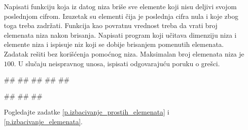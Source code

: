 \begin{Exercise}[label=v.brisanje_elemenata]
Napisati funkciju koja iz datog niza briše sve elemente koji nisu
deljivi svojom poslednjom cifrom. Izuzetak su elementi čija je poslednja
cifra nula i koje zbog toga treba zadržati. Funkcija kao povratnu vrednost treba
da vrati broj elemenata niza nakon brisanja. 
Napisati program koji učitava dimenziju niza i elemente niza i ispisuje niz koji se dobije 
brisanjem pomenutih elemenata. Zadatak rešiti bez korišćenja pomoćnog niza.
Maksimalan broj elemenata niza je $100$.
U slučaju neispravnog unosa, ispisati odgovarajuću poruku o grešci. 

\begin{miditest}
\begin{upotreba}{1}
#\naslovInt#
##
##
##
##
\end{upotreba}
\end{miditest}
\begin{miditest}
\begin{upotreba}{2}
#\naslovInt#
##
##
\end{upotreba}
\end{miditest}
\end{Exercise}

\ifresenja
\begin{Answer}[ref=v.brisanje_elemenata]

Pogledajte zadatke \ref{p.izbacivanje_prostih_elemenata} i \ref{p.izbacivanje_elemenata}.
\end{Answer}
\fi


